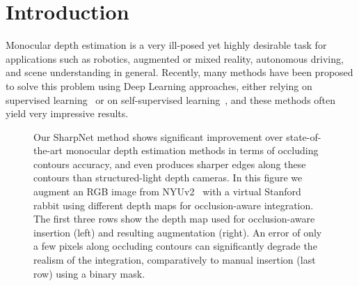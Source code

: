 \documentclass[10pt,twocolumn,letterpaper]{article}
\begin{document}
\section{Introduction}


  
Monocular depth  estimation is a  very ill-posed  yet highly desirable  task for
applications such as  robotics, augmented or mixed  reality, autonomous driving,
and scene understanding in general. Recently, many methods have been proposed to
solve this problem using Deep Learning approaches, either relying on supervised
learning~\cite{Eigen14, Eigen2015PredictingDS, Laina2016DeeperDP, FuCVPR18-DORN}
or on self-supervised learning~\cite{monodepth17,XieDeep3D,PoggiTrinocular},  
and  these methods often yield very impressive results.




\begin{figure}
\begin{center}	
\label{fig:one}
\caption{Our SharpNet method shows significant  improvement over 
state-of-the-art monocular depth estimation methods in  terms  of  occluding  
contours  accuracy, and even produces sharper edges along these contours than 
structured-light depth cameras.
In this figure we augment an RGB image from NYUv2~\cite{Nyuv2} with a virtual 
Stanford  
rabbit using different depth maps for  occlusion-aware integration. The first 
three rows show the depth map used for occlusion-aware insertion (left)  and 
resulting augmentation (right).  
An error of only a few pixels along occluding contours can significantly degrade
the realism of the integration, comparatively to manual insertion (last row) 
using a binary mask.
\vspace{-0.2cm}
}
\end{center}
\end{figure}
\end{document}
